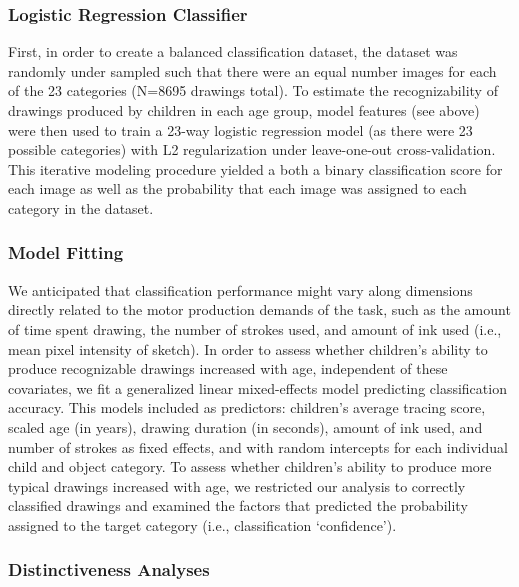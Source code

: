 \documentclass[10pt, letterpaper]{article}
\begin{document}
\subsubsection{Logistic Regression
Classifier}\label{logistic-regression-classifier}

First, in order to create a balanced classification dataset, the dataset
was randomly under sampled such that there were an equal number images
for each of the 23 categories (N=8695 drawings total). To estimate the
recognizability of drawings produced by children in each age group,
model features (see above) were then used to train a 23-way logistic
regression model (as there were 23 possible categories) with L2
regularization under leave-one-out cross-validation. This iterative
modeling procedure yielded a both a binary classification score for each
image as well as the probability that each image was assigned to each
category in the dataset.

\subsubsection{Model Fitting}\label{model-fitting}

We anticipated that classification performance might vary along
dimensions directly related to the motor production demands of the task,
such as the amount of time spent drawing, the number of strokes used,
and amount of ink used (i.e., mean pixel intensity of sketch). In order
to assess whether children's ability to produce recognizable drawings
increased with age, independent of these covariates, we fit a
generalized linear mixed-effects model predicting classification
accuracy. This models included as predictors: children's average tracing
score, scaled age (in years), drawing duration (in seconds), amount of
ink used, and number of strokes as fixed effects, and with random
intercepts for each individual child and object category. To assess
whether children's ability to produce more typical drawings increased
with age, we restricted our analysis to correctly classified drawings
and examined the factors that predicted the probability assigned to the
target category (i.e., classification `confidence').

\subsubsection{Distinctiveness Analyses}\label{distinctiveness-analyses}
\end{document}
